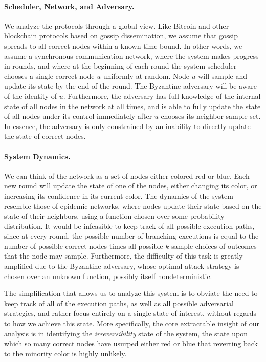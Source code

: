 \documentclass[letterpaper,twocolumn,10pt]{article}
\theoremstyle{definition}
\begin{document}
\paragraph{Scheduler, Network, and Adversary.} 
We analyze the protocols through a global view. 
Like Bitcoin and other blockchain protocols based on gossip dissemination, we assume that gossip spreads to all correct nodes within a known time bound.  
In other words, we assume a synchronous communication network, where the system makes progress in rounds, and where at the beginning of each round the system scheduler chooses a single correct node $u$ uniformly at random. 
Node $u$ will sample and update its state by the end of the round. 
The Byzantine adversary will be aware of the identity of $u$. Furthermore, the adversary has full knowledge of the internal state of all nodes in the network at all times, and is able to fully update the state of all nodes under its control immediately after $u$ chooses its neighbor sample set. 
In essence, the adversary is only constrained by an inability to directly update the state of correct nodes. 

\paragraph{System Dynamics.} We can think of the network as a set of nodes either colored red or blue. Each new round will update the state of one of the nodes, either changing its color, or increasing its confidence in its current color. 
The dynamics of the system resemble those of epidemic networks, where nodes update their state based on the state of their neighbors, using a function chosen over some probability distribution. 
It would be infeasible to keep track of all possible execution paths, since at every round, the possible number of branching executions is equal to the number of possible correct nodes times all possible $k$-sample choices of outcomes that the node may sample. Furthermore, the difficulty of this task is greatly amplified due to the Byzantine adversary, whose optimal attack strategy is chosen over an unknown function, possibly itself nondeterministic. 

The simplification that allows us to analyze this system is to obviate the need to keep track of all of the execution paths, as well as all possible adversarial strategies, and rather focus entirely on a single state of interest, without regards to how we achieve this state. 
More specifically, the core extractable insight of our analysis is in identifying the \textit{irreversibility} state of the system, the state upon which so many correct nodes have usurped either red or blue that reverting back to the minority color is highly unlikely. 
\end{document}
